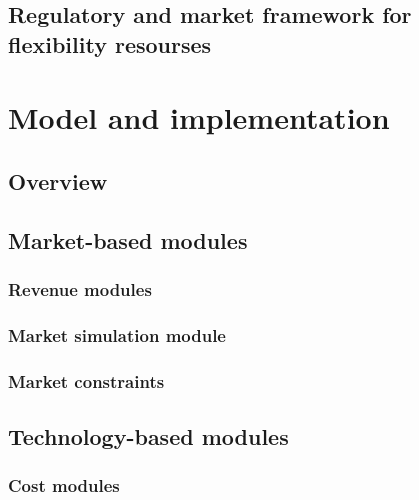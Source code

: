 \documentclass[a4paper,11pt,twoside,onecolumn]{book}
\begin{document}


%

\section{Regulatory and market framework for flexibility resourses}

\chapter{Model and implementation}
%

\section{Overview}

\section{Market-based modules}
\subsection{Revenue modules}


\subsection{Market simulation module}

\subsection{Market constraints}

\section{Technology-based modules}
\subsection{Cost modules}
\end{document}

